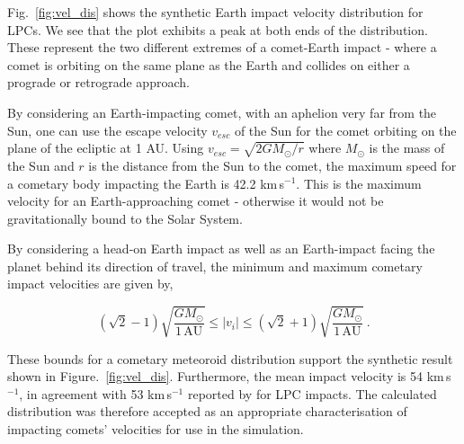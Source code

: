 Fig.~\ref{fig:vel_dis} shows the synthetic Earth impact velocity distribution for LPCs. We see that the plot exhibits a peak at both ends of the distribution. These represent the two different extremes of a comet-Earth impact - where a comet is orbiting on the same plane as the Earth and collides on either a prograde or retrograde approach. 

By considering an Earth-impacting comet, with an aphelion very far from the Sun, one can use the escape velocity $v_{esc}$ of the Sun for the comet orbiting on the plane of the ecliptic at 1 AU. Using $v_{esc}=\sqrt{2GM_{\odot}/r}$ where $M_{\odot}$ is the mass of the Sun and $r$ is the distance from the Sun to the comet, the maximum speed for a cometary body impacting the Earth is 42.2 km$\,$s$^{-1}$. This is the maximum velocity for an Earth-approaching comet - otherwise it would not be gravitationally bound to the Solar System. 

By considering a head-on Earth impact as well as an Earth-impact facing the planet behind its direction of travel, the minimum and maximum cometary impact velocities are given by,

\vspace{-2ex}
\begin{equation}
    (\sqrt{2}-1) \sqrt{ \dfrac{GM_{\odot}}{1 \,\mathrm{AU}} } \leq |v_i| \leq (\sqrt{2}+1) \sqrt{\dfrac{GM_{\odot}}{1 \,\mathrm{AU}}} ~.
\end{equation}
 
These bounds for a cometary meteoroid distribution support the synthetic result shown in Figure.~\ref{fig:vel_dis}. Furthermore, the mean impact velocity is 54 km$\,$s$^{-1}$, in agreement with 53 km$\,$s$^{-1}$ reported by \cite{1988merc.book..274S} for LPC impacts. The calculated distribution was therefore accepted as an appropriate characterisation of impacting comets' velocities for use in the simulation.


